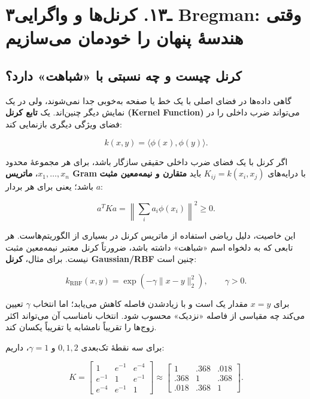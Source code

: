\documentclass[12pt,a4paper,oneside]{book}
\begin{document}
\section{۳ـ۱۳. کرنل‌ها و واگرایی Bregman: وقتی هندسهٔ پنهان را خودمان می‌سازیم}\label{ux640ux6f1ux6f3.-ux6a9ux631ux646ux644ux647ux627-ux648-ux648ux627ux6afux631ux627ux6ccux6cc-bregman-ux648ux642ux62aux6cc-ux647ux646ux62fux633ux647-ux67eux646ux647ux627ux646-ux631ux627-ux62eux648ux62fux645ux627ux646-ux645ux6ccux633ux627ux632ux6ccux645}

\subsection{کرنل چیست و چه نسبتی با «شباهت» دارد؟}\label{ux6a9ux631ux646ux644-ux686ux6ccux633ux62a-ux648-ux686ux647-ux646ux633ux628ux62aux6cc-ux628ux627-ux634ux628ux627ux647ux62a-ux62fux627ux631ux62f}

گاهی داده‌ها در فضای اصلی با یک خط یا صفحه به‌خوبی جدا نمی‌شوند، ولی در یک نمایش دیگر چنین‌اند. یک \textbf{تابع کرنل (Kernel Function)} می‌تواند ضرب داخلی را در فضای ویژگی دیگری بازنمایی کند:

\[
k(x,y)=\langle\phi(x),\phi(y)\rangle.
\]

اگر کرنل با یک فضای ضرب داخلی حقیقی سازگار باشد، برای هر مجموعهٔ محدود \(x_1,\ldots,x_n\)، \textbf{ماتریس Gram} با درایه‌های \(K_{ij}=k(x_i,x_j)\) باید \textbf{متقارن و نیمه‌معین مثبت} باشد؛ یعنی برای هر بردار \(a\):

\[
a^TKa=\left\|\sum_i a_i\phi(x_i)\right\|^2\ge0.
\]

این خاصیت، دلیل ریاضی استفاده از ماتریس کرنل در بسیاری از الگوریتم‌هاست. هر تابعی که به دلخواه اسم «شباهت» داشته باشد، ضرورتاً کرنل معتبر نیمه‌معین مثبت نیست. برای مثال، \textbf{کرنل Gaussian/RBF} چنین است:

\[
k_{\mathrm{RBF}}(x,y)=\exp(-\gamma\|x-y\|_2^2),\qquad\gamma>0.
\]

برای \(x=y\) مقدار یک است و با زیادشدن فاصله کاهش می‌یابد؛ اما انتخاب \(\gamma\) تعیین می‌کند چه مقیاسی از فاصله «نزدیک» محسوب شود. انتخاب نامناسب آن می‌تواند اکثر زوج‌ها را تقریباً نامشابه یا تقریباً یکسان کند.

برای سه نقطهٔ تک‌بعدی \(0,1,2\) و \(\gamma=1\)، داریم:

\[
K=\begin{bmatrix}
1&e^{-1}&e^{-4}\\
e^{-1}&1&e^{-1}\\
e^{-4}&e^{-1}&1
\end{bmatrix}
\approx\begin{bmatrix}
1&.368&.018\\.368&1&.368\\.018&.368&1
\end{bmatrix}.
\]
\end{document}
